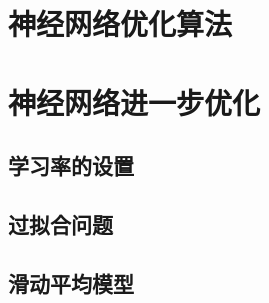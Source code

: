 \documentclass{article}\usepackage{float}\usepackage{listings} \usepackage{braket} \usepackage{amsmath,amssymb} \usepackage{geometry} \usepackage{graphicx} \usepackage{fancyvrb}\usepackage{braket} \usepackage{bm}\usepackage{hyperref} \usepackage{CJKutf8} \geometry{left=0.2cm,right=0.2cm,top=0.2cm,bottom=0.2cm} \renewcommand{\theequation}{\arabic{section}.\arabic{equation}} \renewcommand{\baselinestretch}{1.5}
\begin{document}
\begin{CJK}{UTF8}{gbsn}
\section{神经网络优化算法}
\label{sec:org90a2418}
\section{神经网络进一步优化}
\label{sec:org5f20e0b}

\subsection{学习率的设置}
\label{sec:org11bb285}

\subsection{过拟合问题}
\label{sec:org9516d59}

\subsection{滑动平均模型}
\label{sec:org8864399}
  
  
\end{CJK}
\end{document}

